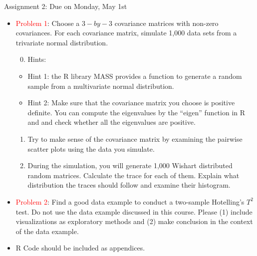\documentclass[
  ignorenonframetext,
]{beamer}
\providecommand{\tightlist}{%
  \setlength{\itemsep}{0pt}\setlength{\parskip}{0pt}}
\begin{document}
\begin{frame}{Assignment 2: Due on Monday, May 1st}
\protect\hypertarget{assignment-2-due-on-monday-may-1st}{}
\begin{itemize}
\item
  \textcolor{red}{Problem 1}: Choose a \(3-by-3\) covariance matrices
  with non-zero covariances. For each covariance matrix, simulate 1,000
  data sets from a trivariate normal distribution.

  \begin{enumerate}
  \setcounter{enumi}{-1}
  \tightlist
  \item
    Hints:
  \end{enumerate}

  \begin{itemize}
  \tightlist
  \item
    Hint 1: the R library MASS provides a function to generate a random
    sample from a multivariate normal distribution.
  \item
    Hint 2: Make sure that the covariance matrix you choose is positive
    definite. You can compute the eigenvalues by the ``eigen'' function
    in R and and check whether all the eigenvalues are positive.
  \end{itemize}

  \begin{enumerate}
  \tightlist
  \item
    Try to make sense of the covariance matrix by examining the pairwise
    scatter plots using the data you simulate.
  \item
    During the simulation, you will generate 1,000 Wishart distributed
    random matrices. Calculate the trace for each of them. Explain what
    distribution the traces should follow and examine their histogram.
  \end{enumerate}
\item
  \textcolor{red}{Problem 2}: Find a good data example to conduct a
  two-sample Hotelling's \(T^2\) test. Do not use the data example
  discussed in this course. Please (1) include visualizations as
  exploratory methods and (2) make conclusion in the context of the data
  example.
\item
  R Code should be included as appendices.
\end{itemize}
\end{frame}
\end{document}

